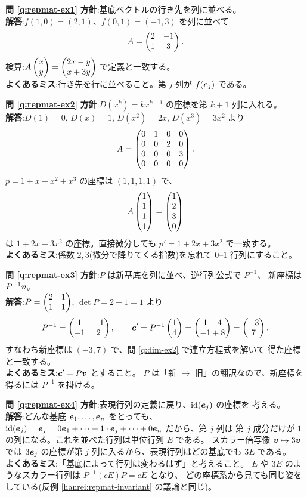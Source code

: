 \bigskip
\noindent\textbf{問 \ref{q:repmat-ex1}}\quad
\textbf{方針}:基底ベクトルの行き先を列に並べる。\\
\textbf{解答}:$f(1, 0) = (2, 1)$、$f(0, 1) = (-1, 3)$ を列に並べて
\[
A = \begin{pmatrix}2 & -1 \\ 1 & 3\end{pmatrix}.
\]
検算:$A\begin{pmatrix}x \\ y\end{pmatrix} = \begin{pmatrix}2x - y \\ x + 3y\end{pmatrix}$ で定義と一致する。\\
\textbf{よくあるミス}:行き先を行に並べること。第 $j$ 列が
$f(\bm{e}_j)$ である。

\bigskip
\noindent\textbf{問 \ref{q:repmat-ex2}}\quad
\textbf{方針}:$D(x^k) = kx^{k-1}$ の座標を第 $k + 1$ 列に入れる。\\
\textbf{解答}:$D(1) = 0$, $D(x) = 1$, $D(x^2) = 2x$, $D(x^3) = 3x^2$ より
\[
A = \begin{pmatrix}0 & 1 & 0 & 0 \\ 0 & 0 & 2 & 0 \\ 0 & 0 & 0 & 3 \\ 0 & 0 & 0 & 0\end{pmatrix}.
\]
$p = 1 + x + x^2 + x^3$ の座標は $(1, 1, 1, 1)$ で、
\[
A\begin{pmatrix}1 \\ 1 \\ 1 \\ 1\end{pmatrix} = \begin{pmatrix}1 \\ 2 \\ 3 \\ 0\end{pmatrix}
\]
は $1 + 2x + 3x^2$ の座標。直接微分しても
$p' = 1 + 2x + 3x^2$ で一致する。\\
\textbf{よくあるミス}:係数 $2, 3$(微分で降りてくる指数)を忘れて
$0$–$1$ 行列にすること。

\bigskip
\noindent\textbf{問 \ref{q:repmat-ex3}}\quad
\textbf{方針}:$P$ は新基底を列に並べ、逆行列公式で $P^{-1}$、
新座標は $P^{-1}\bm{v}$。\\
\textbf{解答}:$P = \begin{pmatrix}2 & 1 \\ 1 & 1\end{pmatrix}$, $\det P = 2 - 1 = 1$ より
\[
P^{-1} = \begin{pmatrix}1 & -1 \\ -1 & 2\end{pmatrix}, \qquad
\bm{c}' = P^{-1}\begin{pmatrix}1 \\ 4\end{pmatrix} = \begin{pmatrix}1 - 4 \\ -1 + 8\end{pmatrix} = \begin{pmatrix}-3 \\ 7\end{pmatrix}.
\]
すなわち新座標は $(-3, 7)$ で、問 \ref{q:dim-ex2} で連立方程式を解いて
得た座標と一致する。\\
\textbf{よくあるミス}:$\bm{c}' = P\bm{v}$ とすること。
$P$ は「新 $\to$ 旧」の翻訳なので、新座標を得るには $P^{-1}$ を掛ける。

\bigskip
\noindent\textbf{問 \ref{q:repmat-ex4}}\quad
\textbf{方針}:表現行列の定義に戻り、$\mathrm{id}(\bm{e}_j)$ の座標を
考える。\\
\textbf{解答}:どんな基底 $\bm{e}_1, \dots, \bm{e}_n$ をとっても、
$\mathrm{id}(\bm{e}_j) = \bm{e}_j = 0\bm{e}_1 + \cdots
+ 1 \cdot \bm{e}_j + \cdots + 0\bm{e}_n$ だから、第 $j$ 列は
第 $j$ 成分だけが $1$ の列になる。これを並べた行列は単位行列 $E$ である。
スカラー倍写像 $\bm{v} \mapsto 3\bm{v}$ では
$3\bm{e}_j$ の座標が第 $j$ 列に入るから、表現行列はどの基底でも
$3E$ である。\\
\textbf{よくあるミス}:「基底によって行列は変わるはず」と考えること。
$E$ や $3E$ のようなスカラー行列は $P^{-1}(cE)P = cE$ となり、
どの座標系から見ても同じ姿をしている(反例 \ref{hanrei:repmat-invariant}
の議論と同じ)。

